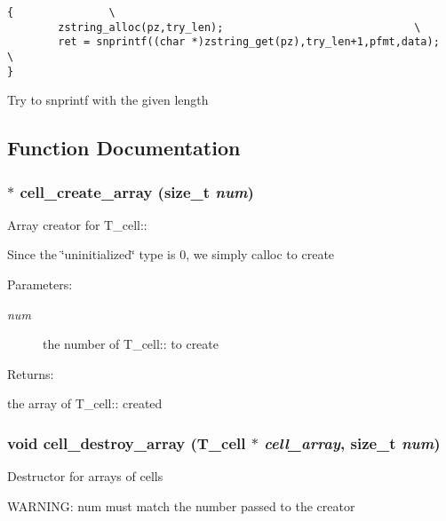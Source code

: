 \footnotesize\begin{verbatim}{               \
        zstring_alloc(pz,try_len);                              \
        ret = snprintf((char *)zstring_get(pz),try_len+1,pfmt,data);    \
}\end{verbatim}\normalsize 
Try to snprintf with the given length 

\subsection{Function Documentation}
\subsubsection{$\ast$ cell\_\-create\_\-array (size\_\-t {\em num})}\label{group__table__cell_a2}


Array creator for T\_\-cell::

Since the \char`\"{}uninitialized\char`\"{} type is 0, we simply calloc to create\begin{Desc}
\item[Parameters: ]\par
\begin{description}
\item[{\em 
num}]the number of T\_\-cell:: to create \end{description}
\end{Desc}
\begin{Desc}
\item[Returns: ]\par
the array of T\_\-cell:: created \end{Desc}
\subsubsection{\setlength{\rightskip}{0pt plus 5cm}void cell\_\-destroy\_\-array ({\bf T\_\-cell} $\ast$ {\em cell\_\-array}, size\_\-t {\em num})}\label{group__table__cell_a3}


Destructor for arrays of cells

WARNING: num must match the number passed to the creator 
